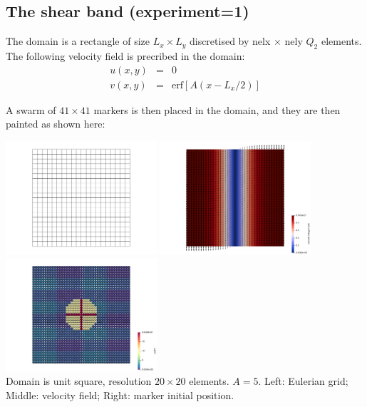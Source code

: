 












\newpage
\subsection*{The shear band (experiment=1)}

The domain is a rectangle of size $L_x\times L_y$ discretised by nelx $\times$ nely $Q_2$ elements.
The following velocity field is precribed in the domain:
\begin{eqnarray}
u(x,y)&=&0 \\
v(x,y)&=&\text{erf} [A(x-L_x/2)]
\end{eqnarray}

A swarm of $41\times41$ markers is then placed in the domain, 
and they are then painted as shown here:
\begin{center}
\includegraphics[width=5.6cm]{python_codes/fieldstone_89/results/shearband/init/grid}
\includegraphics[width=5.6cm]{python_codes/fieldstone_89/results/shearband/init/vel}
\includegraphics[width=5.6cm]{python_codes/fieldstone_89/results/shearband/init/markers}\\
{\captionfont Domain is unit square, resolution $20\times20$ elements. $A=5$. 
Left: Eulerian grid; Middle: velocity field; Right: marker initial position.}
\end{center}

